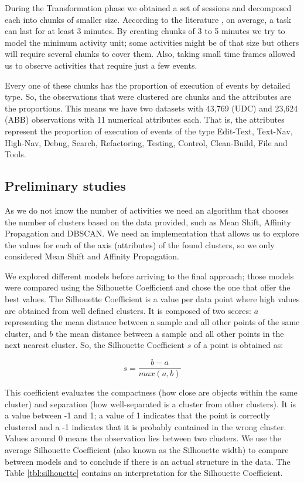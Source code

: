 \begin{changedforreviewerlong}

During the Transformation phase we obtained a set of sessions and decomposed each into chunks of smaller size. According to the literature \cite{GM04}, on average, a task can last for at least 3 minutes. By creating chunks of 3 to 5 minutes we try to model the minimum activity unit; some activities might be of that size but others will require several chunks to cover them. Also, taking small time frames allowed us to observe activities that require just a few events.

\end{changedforreviewerlong}

Every one of these chunks has the proportion of execution of events by detailed type. So, the observations that were clustered are chunks and the attributes are the proportions. This means we have two datasets with 43,769 (UDC) and 23,624 (ABB) observations with 11 numerical attributes each. That is, the attributes represent the proportion of execution of events of the type Edit-Text, Text-Nav, High-Nav, Debug, Search, Refactoring, Testing, Control, Clean-Build, File and Tools.

\subsection{Preliminary studies}
As we do not know the number of activities we need an algorithm that chooses the number of clusters based on the data provided, such as Mean Shift, Affinity Propagation and DBSCAN. We need an implementation that allows us to explore the values for each of the axis (attributes) of the found clusters, so we only considered Mean Shift and Affinity Propagation.

We explored different models before arriving to the final approach; those models were compared using the Silhouette Coefficient and chose the one that offer the best values. The Silhouette Coefficient \cite{R87} is a value per data point where high values are obtained from well defined clusters. It is composed of two scores: $a$ representing the mean distance between a sample and all other points of the same cluster, and $b$ the mean distance between a sample and all other points in the next nearest cluster. So, the Silhouette Coefficient $s$ of a point is obtained as:

$$s = \frac{b-a}{max(a,b)}$$

This coefficient evaluates the compactness (how close are objects within the same cluster) and separation (how well-separated is a cluster from other clusters). It is a value between -1 and 1; a value of 1 indicates that the point is correctly clustered and a -1 indicates that it is probably contained in the wrong cluster. Values around 0 means the observation lies between two clusters. We use the average Silhouette Coefficient (also known as the Silhouette width) to compare between models and to conclude if there is an actual structure in the data. The Table \ref{tbl:silhouette} contains an interpretation for the Silhouette Coefficient.

